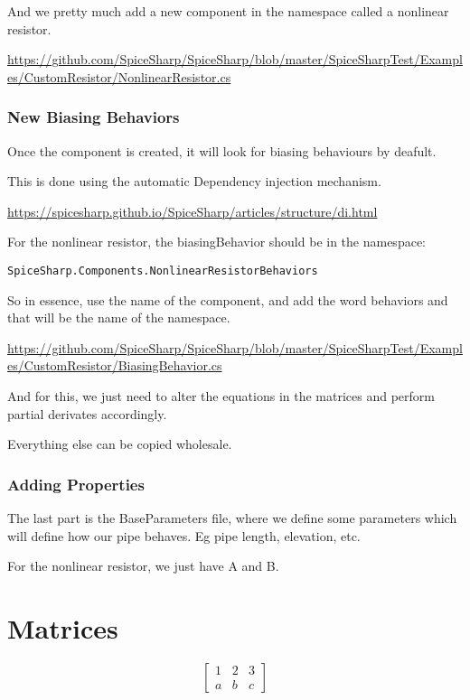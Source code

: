\documentclass[12pt]{article}
\renewcommand{\_}{\kern-1.5pt\textunderscore\kern-1.5pt}
\begin{document}
And we pretty much add a new component in the namespace called a nonlinear resistor.

\url{https://github.com/SpiceSharp/SpiceSharp/blob/master/SpiceSharpTest/Examples/CustomResistor/NonlinearResistor.cs}

\section{New Biasing Behaviors}
Once the component is created, it will look for biasing behaviours by deafult.

This is done using the automatic Dependency injection mechanism.

\url{https://spicesharp.github.io/SpiceSharp/articles/structure/di.html}

For the nonlinear resistor, the biasingBehavior should be in the namespace:

\begin{verbatim}
SpiceSharp.Components.NonlinearResistorBehaviors	
\end{verbatim}

So in essence, use the name of the component, and add the word behaviors and 
that will be the name of the namespace.

\url{https://github.com/SpiceSharp/SpiceSharp/blob/master/SpiceSharpTest/Examples/CustomResistor/BiasingBehavior.cs}

And for this, we just need to alter the equations in the matrices and perform partial derivates accordingly.

Everything else can be copied wholesale.

\section[]{Adding Properties}

The last part is the BaseParameters file, where we define some parameters which 
will define how our pipe behaves. Eg pipe length, elevation, etc.

For the nonlinear resistor, we just have A and B.

\part{Matrices}

$$\begin{bmatrix}
1 & 2 & 3 \\
a & b & c
\end{bmatrix}$$

 
\end{document}
